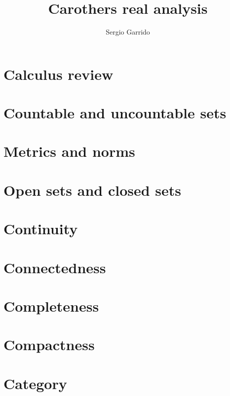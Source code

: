 \documentclass{bookSolutions}
\title{Carothers real analysis}
\author{Sergio Garrido}
\begin{document}
\maketitle

\tableofcontents

\section{Calculus review}



\section{Countable and uncountable sets}




\section{Metrics and norms}





\section{Open sets and closed sets}




\section{Continuity}

\section{Connectedness}

\section{Completeness}

\section{Compactness}

\section{Category}
\end{document}
